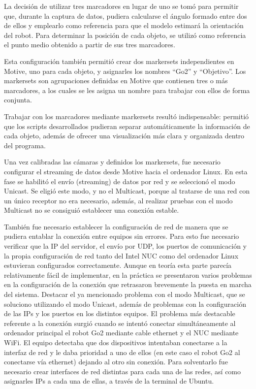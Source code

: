 La decisión de utilizar tres marcadores en lugar de uno se tomó para permitir que, durante la captura de datos, pudiera calcularse el ángulo formado entre dos de ellos y emplearlo como referencia 
para que el modelo estimará la orientación del robot. Para determinar la posición de cada objeto, se utilizó como referencia el punto medio obtenido a partir de sus tres marcadores.

Esta configuración también permitió crear dos \gls{markerset}s independientes en Motive, uno para cada objeto, y asignarles los nombres “Go2” y “Objetivo”. Los \gls{markerset}s son agrupaciones 
definidas en Motive que contienen tres o más marcadores, a los cuales se les asigna un nombre para trabajar con ellos de forma conjunta.

Trabajar con los marcadores mediante \gls{markerset}s resultó indispensable: permitió que los scripts desarrollados pudieran separar automáticamente la información de cada objeto, además de ofrecer 
una visualización más clara y organizada dentro del programa.

Una vez calibradas las cámaras y definidos los \gls{markerset}s, fue necesario configurar el streaming de datos desde Motive hacia el ordenador Linux. En esta fase se habilitó el envío 
(streaming) de datos por red y se seleccionó el modo Unicast. Se eligió este modo, y no el Multicast, porque al tratarse de una red con un único receptor no era necesario, además, al realizar 
pruebas con el modo Multicast no se consiguió establecer una conexión estable. 

También fue necesario establecer la configuración de red de manera que se pudiera entablar la conexión entre equipos sin errores. Para esto fue necesario verificar que la IP del servidor, el 
envío por UDP, los puertos de comunicación y la propia configuración de red tanto del Intel NUC como del ordenador Linux estuvieran configurados correctamente. Aunque en teoría esta parte parecía 
relativamente fácil de implementar, en la práctica se presentaron varios problemas en la configuración de la conexión que retrasaron brevemente la puesta en marcha del sistema. Destacar el 
ya mencionado problema con el modo Multicast, que se soluciono utilizando el modo Unicast, además de problemas con la configuración de las IPs y los puertos en los distintos equipos. El 
problema más destacable referente a la conexión surgió cuando se intentó conectar simultáneamente al ordenador principal el robot Go2 mediante cable ethernet y el NUC mediante WiFi. El 
equipo detectaba que dos dispositivos intentaban conectarse a la interfaz de red y le daba prioridad a uno de ellos (en este caso el robot Go2 al conectarse vía ethernet) dejando 
al otro sin conexión. Para solventarlo fue necesario crear interfaces de red distintas para cada una de las redes, así como asignarles IPs a cada una de ellas, a través de la terminal de Ubuntu.

